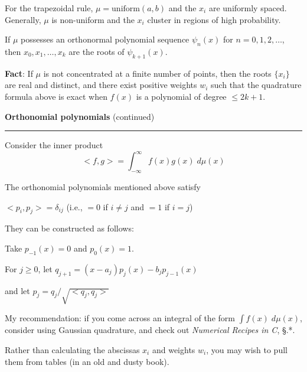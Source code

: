 \documentclass[12pt,letterpaper]{article}
\newcommand{\HRule}{\rule{\linewidth}{4pt}}
\newcommand{\hspone}{\hspace*{1cm}}
\newcommand{\vsphalf}{\vspace*{0.5cm}}
\newcommand{\vspone}{\vspace*{1cm}}
\begin{document}
\bigskip

For the trapezoidal rule, $\mu = \text{uniform}(a,b)$ and the $x_i$
are uniformly spaced.  Generally, $\mu$ is non-uniform and the $x_i$
cluster in regions of high probability.

\bigskip

If $\mu$ possesses an orthonormal polynomial sequence $\psi_n(x)$ for
$n=0, 1, 2, \ldots$, then $x_0, x_1, \ldots, x_k$ are the roots of
$\psi_{k+1}(x)$.

\vspone

\textbf{Fact}: If $\mu$ is not concentrated at a finite number of
points, then the roots $\{x_i\}$ are real and distinct, and there
exist positive weights $w_i$ such that the quadrature formula above is
exact when $f(x)$ is a polynomial of degree $\le 2k+1$.


\newpage

\fontsize{30}{30} \selectfont

\centerline{\textbf{Orthonomial polynomials} (continued)}

\HRule

\vsphalf

\fontsize{20}{25} \selectfont

Consider the inner product
$$<f,g> = \int_{-\infty}^{\infty} f(x) g(x)
\; d\mu(x)$$

\bigskip

The orthonomial polynomials mentioned above satisfy

$<p_i,p_j> = \delta_{ij}$ (i.e., $= 0$ if $i \ne j$ and $=1$ if $i=j$)

\vspone

They can be constructed as follows:

\bigskip

Take $p_{-1}(x) = 0$ and $p_0(x) = 1$.

\bigskip

For $j \ge 0$, let $q_{j+1} = (x-a_j)p_j(x) - b_j p_{j-1}(x)$

\hspone and let $p_j = q_j / \sqrt{<q_j, q_j>}$

\vspone

My recommendation: if you come across an integral of the form $\int
f(x) \; d\mu(x)$, consider using Gaussian quadrature, and check
out \emph{Numerical Recipes in C}, \S *.*.

\bigskip

Rather than calculating the abscissas $x_i$ and weights $w_i$,
you may wish to pull them from tables (in an old and dusty book).
\end{document}
